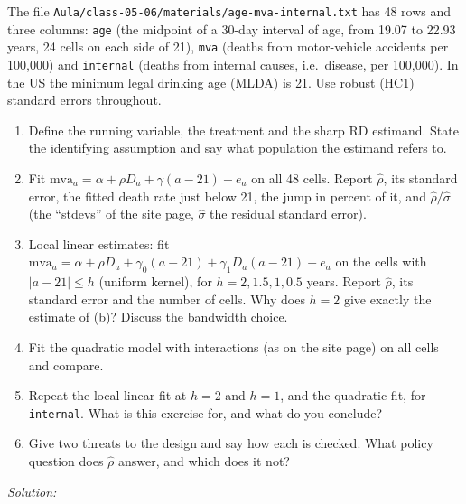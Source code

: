 \documentclass[11pt,a4paper]{article}
\newif\ifsolucoes
\newcommand{\espacoresol}{4.5cm}   %
\newcommand{\resolespaco}{\ifsolucoes\else\par\textit{Solution:}\vspace{\espacoresol}\par\fi}
\begin{document}
\noindent The file \texttt{Aula/class-05-06/materials/age-mva-internal.txt} has 48 rows and three columns:
\texttt{age} (the midpoint of a 30-day interval of age, from 19.07 to 22.93 years, 24 cells on each side
of 21), \texttt{mva} (deaths from motor-vehicle accidents per 100,000) and \texttt{internal} (deaths from
internal causes, i.e.\ disease, per 100,000). In the US the minimum legal drinking age (MLDA) is 21.
Use robust (HC1) standard errors throughout.
\begin{enumerate}[label=(\alph*)]
\item Define the running variable, the treatment and the sharp RD estimand. State the identifying
assumption and say what population the estimand refers to.
\item Fit $\text{mva}_a=\alpha+\rho D_a+\gamma(a-21)+e_a$ on all 48 cells. Report $\hat\rho$, its standard
error, the fitted death rate just below 21, the jump in percent of it, and $\hat\rho/\hat\sigma$ (the
``stdevs'' of the site page, $\hat\sigma$ the residual standard error).
\item Local linear estimates: fit $\text{mva}_a=\alpha+\rho D_a+\gamma_0(a-21)+\gamma_1D_a(a-21)+e_a$ on
the cells with $|a-21|\leq h$ (uniform kernel), for $h=2,1.5,1,0.5$ years. Report $\hat\rho$, its standard
error and the number of cells. Why does $h=2$ give exactly the estimate of (b)? Discuss the bandwidth choice.
\item Fit the quadratic model with interactions (as on the site page) on all cells and compare.
\item Repeat the local linear fit at $h=2$ and $h=1$, and the quadratic fit, for \texttt{internal}. What is
this exercise for, and what do you conclude?
\item Give two threats to the design and say how each is checked. What policy question does $\hat\rho$
answer, and which does it not?
\end{enumerate}
\resolespaco
\end{document}
